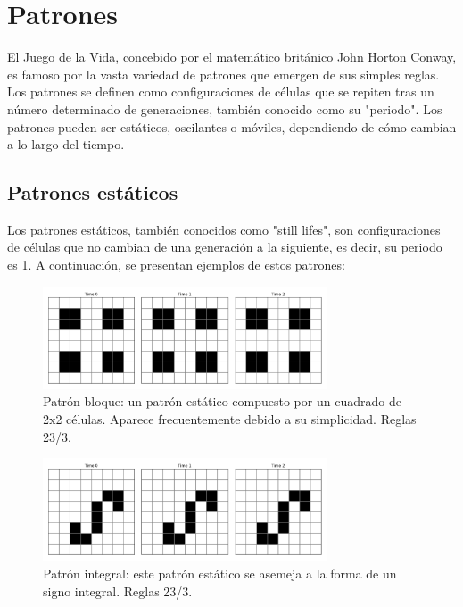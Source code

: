 \documentclass[]{article}
\begin{document}
\section{Patrones}
El Juego de la Vida, concebido por el matemático británico John Horton Conway, es famoso por la vasta variedad de patrones que emergen de sus simples reglas. Los patrones se definen como configuraciones de células que se repiten tras un número determinado de generaciones, también conocido como su "periodo". Los patrones pueden ser estáticos, oscilantes o móviles, dependiendo de cómo cambian a lo largo del tiempo. 

\subsection{Patrones estáticos}
Los patrones estáticos, también conocidos como "still lifes", son configuraciones de células que no cambian de una generación a la siguiente, es decir, su periodo es 1. A continuación, se presentan ejemplos de estos patrones:

\begin{figure}[H]
  \centering
  \includegraphics[width=0.75\textwidth]{../assets/still_life/block/block.png}
  \caption{Patrón bloque: un patrón estático compuesto por un cuadrado de 2x2 células. Aparece frecuentemente debido a su simplicidad. Reglas 23/3.}
  \label{fig:block_23_3}
  \end{figure}

\begin{figure}[H]
  \centering
  \includegraphics[width=0.75\textwidth]{../assets/still_life/integral/integral.png}
  \caption{Patrón integral: este patrón estático se asemeja a la forma de un signo integral. Reglas 23/3.}
  \label{fig:integral}
  \end{figure}
\end{document}
